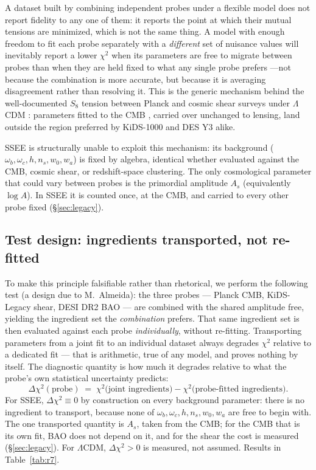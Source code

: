 \documentclass[12pt,a4paper]{article}
\newcommand{\SSEE}{\textsc{SSEE}}
\begin{document}
A dataset built by combining independent probes under a flexible model does
not report fidelity to any one of them: it reports the point at which their
mutual tensions are minimized, which is not the same thing. A model with
enough freedom to fit each probe separately with a \emph{different} set of
nuisance values will inevitably report a lower $\chi^2$ when its parameters are
free to migrate between probes than when they are held fixed to what any
single probe prefers ---not because the combination is more accurate, but
because it is averaging disagreement rather than resolving it. This is the
generic mechanism behind the well-documented $S_8$ tension between Planck and
cosmic shear surveys under $\Lambda$CDM \citep{DiValentino2021}: parameters
fitted to the CMB \citep{Planck2020}, carried over unchanged to lensing, land
outside the region preferred by KiDS-1000 \citep{Asgari2021,Heymans2021} and
DES Y3 \citep{Amon2022} alike.

\SSEE{} is structurally unable to exploit this mechanism: its background
(\(\omega_b,\omega_c,h,n_s,w_0,w_a\)) is fixed by algebra, identical whether
evaluated against the CMB, cosmic shear, or redshift-space clustering. The
only cosmological parameter that could vary between probes is the
primordial amplitude $A_s$ (equivalently $\log A$). In \SSEE{} it is counted
once, at the CMB, and carried to every other probe fixed
(\S\ref{sec:legacy}).

\subsection{Test design: ingredients transported, not re-fitted}
\label{sec:r7}

To make this principle falsifiable rather than rhetorical, we perform the
following test (a design due to M.~Almeida): the three probes --- Planck
CMB, KiDS-Legacy shear, DESI DR2 BAO --- are combined with the shared
amplitude free, yielding the ingredient set the \emph{combination} prefers.
That same ingredient set is then evaluated against each probe
\emph{individually}, without re-fitting. Transporting parameters from a joint
fit to an individual dataset always degrades $\chi^2$ relative to a dedicated
fit --- that is arithmetic, true of any model, and proves nothing by itself.
The diagnostic quantity is how much it degrades relative to what the
probe's own statistical uncertainty predicts:
\begin{equation}
  \Delta\chi^2(\text{probe}) \;=\;
  \chi^2\big(\text{joint ingredients}\big) - \chi^2\big(\text{probe-fitted ingredients}\big).
\end{equation}
For \SSEE{}, $\Delta\chi^2\equiv0$ by construction on every background
parameter: there is no ingredient to transport, because none of
$\omega_b,\omega_c,h,n_s,w_0,w_a$ are free to begin with. The one transported
quantity is $A_s$, taken from the CMB; for the CMB that is its own fit, BAO does not
depend on it, and for the shear the cost is measured (\S\ref{sec:legacy}). For
$\Lambda$CDM, $\Delta\chi^2>0$ is measured, not assumed. Results in
Table~\ref{tab:r7}.
\end{document}
